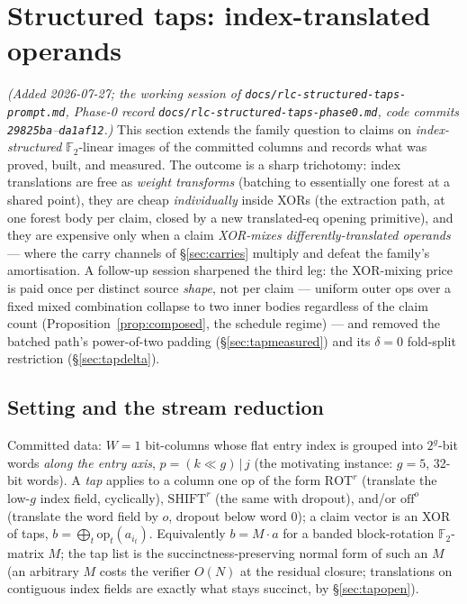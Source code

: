 \documentclass[11pt]{article}
\newcommand{\F}{\mathbb{F}}
\newcommand{\Ftwo}{\F_2}
\DeclareRobustCommand{\code}[1]{{\def\_{\textunderscore\allowbreak}\texttt{#1}}}
\theoremstyle{plain}
\theoremstyle{definition}
\theoremstyle{remark}
\begin{document}
\section{Structured taps: index-translated operands}\label{sec:taps}

\emph{(Added 2026-07-27; the working session of
\code{docs/rlc-structured-taps-prompt.md}, Phase-0 record
\code{docs/rlc-structured-taps-phase0.md}, code commits
\texttt{29825ba}--\texttt{da1af12}.)} This section extends the family
question to claims on \emph{index-structured} $\Ftwo$-linear images of
the committed columns and records what was proved, built, and measured.
The outcome is a sharp trichotomy: index translations are free as
\emph{weight transforms} (batching to essentially one forest at a shared
point), they are cheap \emph{individually} inside XORs (the extraction
path, at one forest body per claim, closed by a new translated-eq
opening primitive), and they are expensive only when a claim
\emph{XOR-mixes differently-translated operands} --- where the carry
channels of \S\ref{sec:carries} multiply and defeat the family's
amortisation. A follow-up session sharpened the third leg: the
XOR-mixing price is paid once per distinct source \emph{shape}, not
per claim --- uniform outer ops over a fixed mixed combination
collapse to two inner bodies regardless of the claim count
(Proposition~\ref{prop:composed}, the schedule regime) --- and
removed the batched path's power-of-two padding
(\S\ref{sec:tapmeasured}) and its $\delta{=}0$ fold-split restriction
(\S\ref{sec:tapdelta}).

\subsection{Setting and the stream reduction}\label{sec:tapsetting}

Committed data: $W{=}1$ bit-columns whose flat entry index is grouped
into $2^{g}$-bit words \emph{along the entry axis}, $p = (k\ll g)\,|\,j$
(the motivating instance: $g=5$, 32-bit words). A \emph{tap} applies to
a column one op of the form $\mathrm{ROT}^{r}$ (translate the low-$g$
index field, cyclically), $\mathrm{SHIFT}^{r}$ (the same with dropout),
and/or $\mathrm{off}^{o}$ (translate the word field by $o$, dropout
below word $0$); a claim vector is an XOR of taps,
$b = \bigoplus_t \mathrm{op}_t(a_{i_t})$. Equivalently $b = M\cdot a$
for a banded block-rotation $\Ftwo$-matrix $M$; the tap list is the
succinctness-preserving normal form of such an $M$ (an arbitrary $M$
costs the verifier $O(N)$ at the residual closure; translations on
contiguous index fields are exactly what stays succinct, by
\S\ref{sec:tapopen}).
\end{document}
